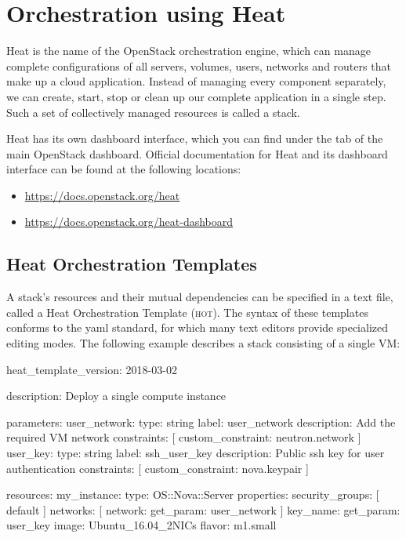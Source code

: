 \chapter{Orchestration using Heat}
\gls{Heat} is the name of the OpenStack orchestration engine, which
can manage complete configurations of all servers, volumes, users,
networks and routers that make up a cloud application.  Instead of
managing every component separately, we can create, start, stop or
clean up our complete application in a single step.  Such a set of
collectively managed resources is called a \gls{stack}.

\gls{Heat} has its own dashboard interface, which you can find under
the  tab of the main OpenStack dashboard.  Official
documentation for Heat and its dashboard interface can be found at the
following locations:
\begin{itemize}
\item \url{https://docs.openstack.org/heat}
\item \url{https://docs.openstack.org/heat-dashboard}
\end{itemize}

\section{\gls{Heat Orchestration Template}s}
A \gls{stack}'s resources and their mutual dependencies can be
specified in a text file, called a \gls{Heat Orchestration Template}
(\textsc{hot}).  The syntax of these templates conforms to the
\gls{yaml} standard, for which many text editors provide specialized
editing modes.  The following example describes a stack consisting of
a single VM:
\begin{code}{}
heat_template_version: 2018-03-02

description: Deploy a single compute instance

parameters:
  user_network:
    type: string
    label: user_network
    description: Add the required VM network
    constraints: [ custom_constraint: neutron.network ]
  user_key:
    type: string
    label: ssh_user_key
    description: Public ssh key for user authentication
    constraints: [ custom_constraint: nova.keypair ]

resources:
  my_instance:
    type: OS::Nova::Server
    properties:
      security_groups: [ default ]
      networks: [ network: { get_param: user_network } ]
      key_name: { get_param: user_key }
      image: Ubuntu_16.04_2NICs
      flavor: m1.small
\end{code}

